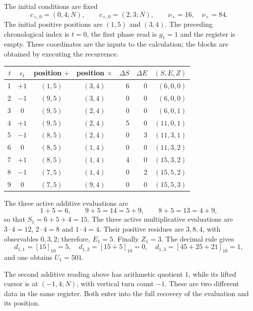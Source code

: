 The initial conditions are fixed
\[
 c_{+,0}=(0,4;N),\qquad c_{\times,0}=(2,3;N),
 \qquad \nu_+=16,\quad\nu_\times=84.
\]
The initial positive positions are \((1,5)\) and \((3,4)\). The preceding
chronological index is \(t=0\), the first phase read is \(g_1=1\) and the
register is empty. These coordinates are the inputs
to the calculation; the blocks are obtained by executing the recurrence.

\begin{tablacompleta}[htbp]
\caption{First window: preceding readings and active accumulation.}
\label{tpk:tabla-501}
\small
\begin{tabular}{@{}rcccrrr@{}}
\toprule
\(t\)&\(\epsilon_t\)&position \(+\)&position \(\times\)&
\(\Delta S\)&\(\Delta E\)&\((S,E,Z)\)\\
\midrule
1&\(+1\)&\((1,5)\)&\((3,4)\)&6&0&\((6,0,0)\)\\
2&\(-1\)&\((9,5)\)&\((3,4)\)&0&0&\((6,0,0)\)\\
3&0&\((9,5)\)&\((2,4)\)&0&0&\((6,0,1)\)\\
4&\(+1\)&\((9,5)\)&\((2,4)\)&5&0&\((11,0,1)\)\\
5&\(-1\)&\((8,5)\)&\((2,4)\)&0&3&\((11,3,1)\)\\
6&0&\((8,5)\)&\((1,4)\)&0&0&\((11,3,2)\)\\
7&\(+1\)&\((8,5)\)&\((1,4)\)&4&0&\((15,3,2)\)\\
8&\(-1\)&\((7,5)\)&\((1,4)\)&0&2&\((15,5,2)\)\\
9&0&\((7,5)\)&\((9,4)\)&0&0&\((15,5,3)\)\\
\bottomrule
\end{tabular}
\end{tablacompleta}

The three active additive evaluations are
\[
 1+5=6,\qquad9+5=14=5+9,\qquad8+5=13=4+9,
\]
so that \(S_1=6+5+4=15\). The three active multiplicative evaluations
are \(3\cdot4=12\), \(2\cdot4=8\) and \(1\cdot4=4\). Their positive
residues are \(3,8,4\), with observables \(0,3,2\); therefore,
\(E_1=5\). Finally \(Z_1=3\). The decimal rule gives
\[
 d_{1,1}=[15]_{10}=5,\quad
 d_{1,2}=[15+5]_{10}=0,\quad
 d_{1,3}=[45+25+21]_{10}=1,
\]
and one obtains \(U_1=501\).

The second additive reading above has arithmetic quotient \(1\),
while its lifted cursor is at \((-1,4;N)\), with vertical turn
count \(-1\). These are two different data in the same register. Both
enter into the full recovery of the evaluation and its position.

